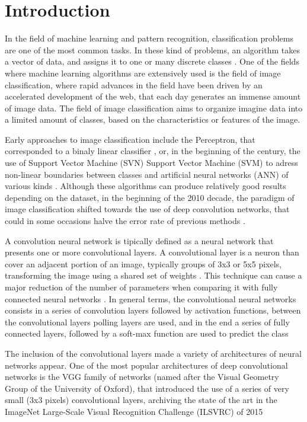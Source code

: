 \documentclass[10pt,twocolumn,letterpaper]{article}
\begin{document}
\section{Introduction}

In the field of machine learning  and pattern recognition, classification problems are one of the most common tasks. In these kind of problems, an algorithm takes a vector of data, and assigns it to one or many discrete classes \cite{Bishop2006}. One of the fields where machine learning algorithms are extensively used is the field of image classification, where rapid advances in the field have been driven by an accelerated development of the web, that each day generates an immense amount of image data. The field of image classification aims to organize imagine data into a limited amount of classes, based on the characteristics or features of the image. \cite{Zhang2019}

Early approaches to image classification include the Perceptron, that corresponded to a binaly linear classifier \cite{Rosenblatt1957}, or, in the beginning of the century, the use of Support Vector Machine (SVN) Support Vector Machine (SVM) \cite{Vapnik1995} to adress non-linear boundaries between classes and artificial neural networks (ANN) of various kinds \cite{Krizhevsky2017}. Although these algorithms can produce relatively good results depending on the dataset, in the beginning of the 2010 decade, the paradigm of image classification shifted towards the use of deep convolution networks, that could in some occasions halve the error rate of previous methods \cite{Krizhevsky2017}. 

A convolution neural network is tipically defined as a neural network that presents one or more convolutional layers. A convolutional layer is a neuron than cover an adjacent portion of an image, typically groups of 3x3 or 5x5 pixels, transforming the image using a shared set of weights . This technique can cause a major reduction of the number of parameters when comparing it with fully connected neural networks \cite{Aghdam2017}. In general terms, the convolutional neural networks consists in a series of convolution layers followed by activation functions, between the convolutional layers polling layers are used, and in the end a series of fully connected layers, followed by a soft-max function are used to predict the class

The inclusion of the convolutional layers made a variety of architectures of neural networks appear. One of the most popular architectures of deep convolutional networks is the VGG family of networks (named after the Visual Geometry Group of the University of Oxford), that introduced the use of a series of very small (3x3 pixels) convolutional layers, archiving the state of the art in the ImageNet Large-Scale Visual Recognition Challenge (ILSVRC) of 2015 \cite{Simonyan2015}
\end{document}

